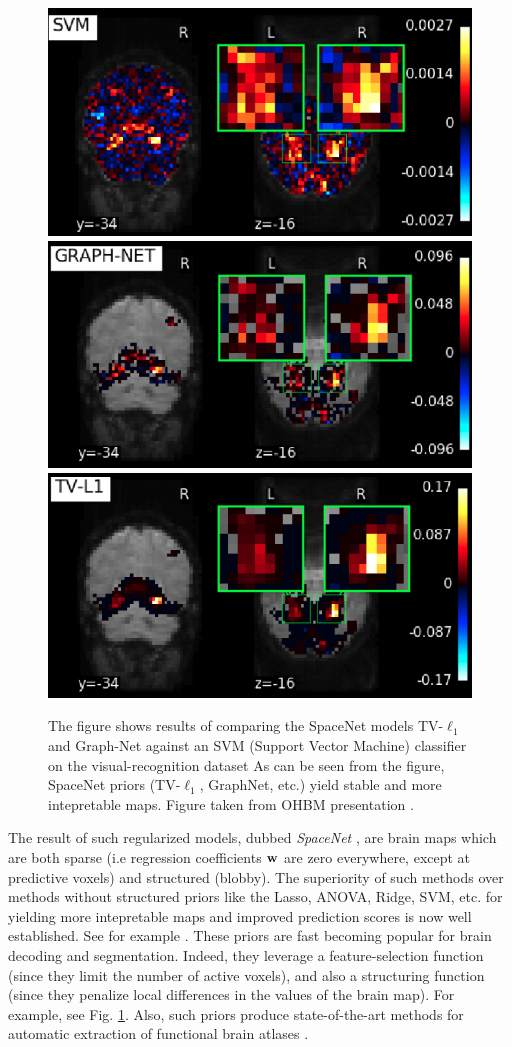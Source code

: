 \begin{figure}[!htb] 
  \includegraphics[width=.325\linewidth]{figures/svm.png}
  \includegraphics[width=.325\linewidth]{figures/graphnet.png}
  \includegraphics[width=.325\linewidth]{figures/tvl1.png}  
  \caption{The figure shows results of comparing the SpaceNet  models TV-$\ell_1$ and
    Graph-Net against an SVM (Support Vector Machine) classifier on
    the visual-recognition dataset   \citep{haxby2001}
    As can be seen from the figure, SpaceNet priors (TV-$\ell_1$, GraphNet, etc.)
    yield stable and more intepretable maps. Figure taken from OHBM
    presentation   \citep{spacenetohbm}.}
  \label{fig:spacenet_maps}
\end{figure}

The result of such regularized models, dubbed \emph{SpaceNet}
  \citep{spacenetohbm}, are brain maps which are both
sparse (i.e regression coefficients $\mathbf{w}$ are zero everywhere, except at
predictive voxels) and structured (blobby). The superiority of such
methods over methods without structured priors like the Lasso, ANOVA,
Ridge, SVM, etc. for yielding more intepretable maps and improved
prediction scores is now well established. See for example
  \citep{baldassarre2012,gramfort2013}. These priors are fast becoming
popular for brain decoding and segmentation. Indeed, they leverage a
feature-selection function
(since they limit the number of active voxels),
and also a structuring function
(since they penalize local
differences in the values of the brain map). For example, see Fig.
\ref{fig:spacenet_maps}.
Also, such priors produce state-of-the-art methods for automatic
extraction of functional brain atlases   \citep{abraham2013}.

